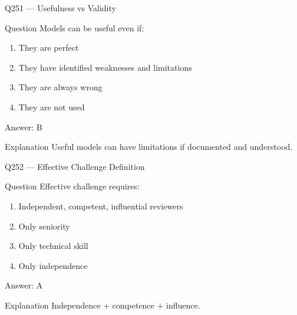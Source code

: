 \documentclass[aspectratio=169,8pt]{beamer}
\begin{document}
								\begin{frame}{Q251 --- Usefulness vs Validity}
									\begin{block}{Question}
										Models can be useful even if:
										\begin{enumerate}
											\item They are perfect
											\item They have identified weaknesses and limitations
											\item They are always wrong
											\item They are not used
										\end{enumerate}
									\end{block}
									\begin{exampleblock}{Answer: B}\end{exampleblock}
									\begin{block}{Explanation}
										Useful models can have limitations if documented and understood.
									\end{block}
								\end{frame}
								
								\begin{frame}{Q252 --- Effective Challenge Definition}
									\begin{block}{Question}
										Effective challenge requires:
										\begin{enumerate}
											\item Independent, competent, influential reviewers
											\item Only seniority
											\item Only technical skill
											\item Only independence
										\end{enumerate}
									\end{block}
									\begin{exampleblock}{Answer: A}\end{exampleblock}
									\begin{block}{Explanation}
										Independence + competence + influence.
									\end{block}
								\end{frame}
								
\end{document}
